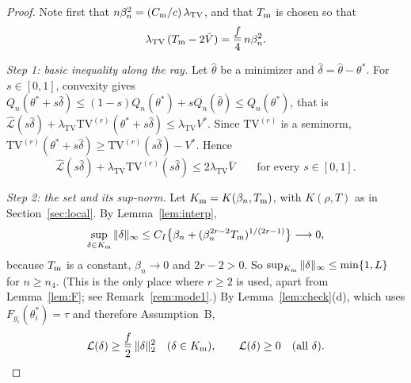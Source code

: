 \documentclass[11pt]{article}
\theoremstyle{definition}
\theoremstyle{remark}
\newcommand{\TV}{\mathrm{TV}}
\newcommand{\lamtv}{\lambda_{\TV}}
\newcommand{\thetas}{\theta^{*}}
\newcommand{\Lh}{\widehat{\mathcal L}}
\newcommand{\Lm}{\mathcal L}
\newcommand{\fl}{\underline f}
\newcommand{\Vb}{\bar V}
\begin{document}
\begin{proof}
Note first that $n\beta_n^2=(C_{\rm m}/c)\,\lamtv$, and that $T_{\rm m}$ is chosen so that
\begin{equation}\label{eq:Tm}
\lamtv\,(T_{\rm m}-2\Vb)=\frac{\fl}{4}\,n\beta_n^2 .
\end{equation}

\emph{Step 1: basic inequality along the ray.} Let $\hat\theta$ be a minimizer and $\hat\delta=\hat\theta-\thetas$. For $s\in[0,1]$, convexity gives $Q_n(\thetas+s\hat\delta)\le(1-s)Q_n(\thetas)+sQ_n(\hat\theta)\le Q_n(\thetas)$, that is $\Lh(s\hat\delta)+\lamtv\TV^{(r)}(\thetas+s\hat\delta)\le\lamtv V^{*}$. Since $\TV^{(r)}$ is a seminorm, $\TV^{(r)}(\thetas+s\hat\delta)\ge\TV^{(r)}(s\hat\delta)-V^{*}$. Hence
\begin{equation}\label{eq:basic}
\Lh(s\hat\delta)+\lamtv\TV^{(r)}(s\hat\delta)\le2\lamtv\Vb\qquad\text{for every }s\in[0,1].
\end{equation}

\emph{Step 2: the set and its sup-norm.} Let $K_{\rm m}=K(\beta_n,T_{\rm m})$, with $K(\rho,T)$ as in Section~\ref{sec:local}. By Lemma~\ref{lem:interp},
\[
\sup_{\delta\in K_{\rm m}}\|\delta\|_\infty\le C_I\bigl\{\beta_n+(\beta_n^{2r-2}T_{\rm m})^{1/(2r-1)}\bigr\}\longrightarrow0,
\]
because $T_{\rm m}$ is a constant, $\beta_n\to0$ and $2r-2>0$. So $\sup_{K_{\rm m}}\|\delta\|_\infty\le\min\{1,L\}$ for $n\ge n_4$. (This is the only place where $r\ge2$ is used, apart from Lemma~\ref{lem:F}; see Remark~\ref{rem:mode1}.) By Lemma~\ref{lem:check}(d), which uses $F_{y_i}(\thetas_i)=\tau$ and therefore Assumption~B,
\begin{equation}\label{eq:margin-m}
\Lm(\delta)\ge\frac{\fl}{2}\,\|\delta\|_2^2\quad(\delta\in K_{\rm m}),\qquad \Lm(\delta)\ge0\quad(\text{all }\delta).
\end{equation}


\end{proof}
\end{document}
